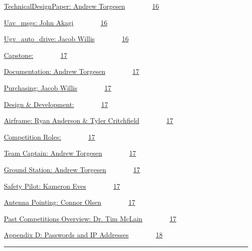 {\protect\hyperlink{h.6tkhkdxr0376}{TechnicalDesignPaper: Andrew
Torgesen}}{~~~~~~~~}{\protect\hyperlink{h.6tkhkdxr0376}{16}}

{\protect\hyperlink{h.gpyymqyjiqy0}{Uav\_msgs: John
Akagi}}{~~~~~~~~}{\protect\hyperlink{h.gpyymqyjiqy0}{16}}

{\protect\hyperlink{h.lnuk2wx0zogg}{Ugv\_auto\_drive: Jacob
Willis}}{~~~~~~~~}{\protect\hyperlink{h.lnuk2wx0zogg}{16}}

{\protect\hyperlink{h.d645jwbpz1js}{Capstone:}}{~~~~~~~~}{\protect\hyperlink{h.d645jwbpz1js}{17}}

{\protect\hyperlink{h.p8pvzhwgals7}{Documentation: Andrew
Torgesen}}{~~~~~~~~}{\protect\hyperlink{h.p8pvzhwgals7}{17}}

{\protect\hyperlink{h.4u5ohftr3ivt}{Purchasing: Jacob
Willis}}{~~~~~~~~}{\protect\hyperlink{h.4u5ohftr3ivt}{17}}

{\protect\hyperlink{h.hdq7osdifj4b}{Design \&
Development:}}{~~~~~~~~}{\protect\hyperlink{h.hdq7osdifj4b}{17}}

{\protect\hyperlink{h.ksxlyips5td6}{Airframe: Ryan Anderson \& Tyler
Critchfield}}{~~~~~~~~}{\protect\hyperlink{h.ksxlyips5td6}{17}}

{\protect\hyperlink{h.uewzmm294rc5}{Competition
Roles:}}{~~~~~~~~}{\protect\hyperlink{h.uewzmm294rc5}{17}}

{\protect\hyperlink{h.g1aru5oodxem}{Team Captain: Andrew
Torgesen}}{~~~~~~~~}{\protect\hyperlink{h.g1aru5oodxem}{17}}

{\protect\hyperlink{h.v9u227xrzjux}{Ground Station: Andrew
Torgesen}}{~~~~~~~~}{\protect\hyperlink{h.v9u227xrzjux}{17}}

{\protect\hyperlink{h.5qjlfzs1vco2}{Safety Pilot: Kameron
Eves}}{~~~~~~~~}{\protect\hyperlink{h.5qjlfzs1vco2}{17}}

{\protect\hyperlink{h.onmum1m8p9el}{Antenna Pointing: Connor
Olsen}}{~~~~~~~~}{\protect\hyperlink{h.onmum1m8p9el}{17}}

{\protect\hyperlink{h.9vddyurbqkh1}{Past Competitions Overview: Dr. Tim
McLain}}{~~~~~~~~}{\protect\hyperlink{h.9vddyurbqkh1}{17}}

{\protect\hyperlink{h.ejo1f4jddl42}{Appendix D: Passwords and IP
Addresses}}{~~~~~~~~}{\protect\hyperlink{h.ejo1f4jddl42}{18}}

\begin{center}\rule{0.5\linewidth}{\linethickness}\end{center}

\section{\texorpdfstring{{}}{}}\label{h.1hizwarbp4u3}

